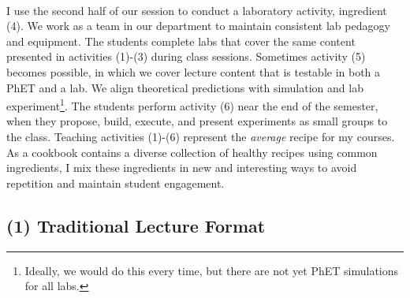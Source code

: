 \documentclass[../../../main.tex]{subfiles}
\begin{document}
\\
\vspace{0.25cm}
I use the second half of our session to conduct a laboratory activity, ingredient (4).  We work as a team in our department to maintain consistent lab pedagogy and equipment.  The students complete labs that cover the same content presented in activities (1)-(3) during class sessions.  Sometimes activity (5) becomes possible, in which we cover lecture content that is testable in both a PhET and a lab.  We align theoretical predictions with simulation and lab experiment\footnote{Ideally, we would do this every time, but there are not yet PhET simulations for all labs.}.  The students perform activity (6) near the end of the semester, when they propose, build, execute, and present experiments as small groups to the class.  Teaching activities (1)-(6) represent the \textit{average} recipe for my courses.  As a cookbook contains a diverse collection of healthy recipes using common ingredients, I mix these ingredients in new and interesting ways to avoid repetition and maintain student engagement.

\subsection{(1) Traditional Lecture Format}
\end{document}
